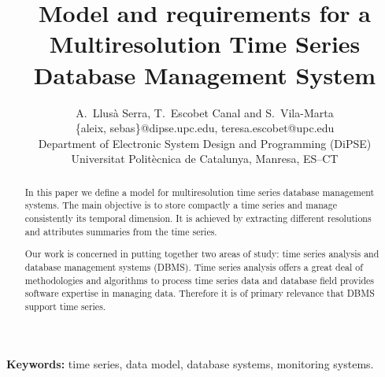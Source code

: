 \documentclass{scrartcl}
\title{%
  Model and requirements for a Multiresolution Time Series
  Database Management System }
\author
{
  {%
    A.\ Llusà Serra,
    T.\ Escobet Canal
    and S.\ Vila-Marta
  }\\
  {\large \{aleix, sebas\}@dipse.upc.edu, teresa.escobet@upc.edu}\\
  {\large Department of Electronic System Design and Programming (DiPSE)}\\
  {\large Universitat Politècnica de Catalunya, Manresa, ES--CT}
}
\begin{document}
\maketitle


\begin{abstract}
In this paper we define a model for multiresolution time series
database management systems. The main objective is to store compactly
a time series and manage consistently its temporal dimension. It is
achieved by extracting different resolutions and attributes summaries
from the time series.  

Our work is concerned in putting together two areas of study: time
series analysis and database management systems (DBMS). Time series analysis
offers a great deal of methodologies and algorithms to process time
series data and database field provides software expertise in managing
data. Therefore it is of primary relevance that DBMS support time series.
\end{abstract}

{\bfseries Keywords:} time series, data model, database systems,
monitoring systems.












\printbibliography{}
\end{document}
